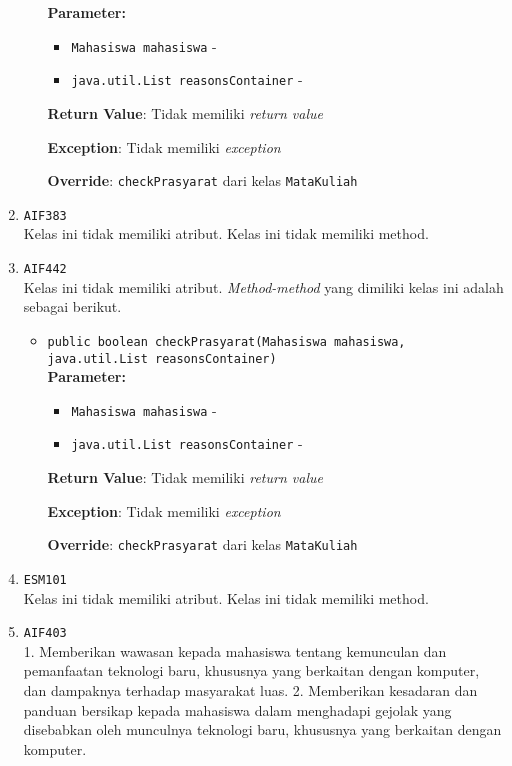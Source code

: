 \documentclass{article}
\begin{document}
\begin{enumerate}
\begin{itemize}
\textbf{Parameter:}\begin{itemize}
\item \texttt{Mahasiswa mahasiswa} - 
\item \texttt{java.util.List reasonsContainer} - 
\end{itemize}
\textbf{Return Value}: Tidak memiliki \textit{return value}

\textbf{Exception}: Tidak memiliki \textit{exception}

\textbf{Override}: \texttt{checkPrasyarat} dari kelas \texttt{MataKuliah}

\end{itemize}
\item \texttt{AIF383}\\ 


Kelas ini tidak memiliki atribut. Kelas ini tidak memiliki method. \item \texttt{AIF442}\\ 


Kelas ini tidak memiliki atribut. \textit{Method-method} yang dimiliki kelas ini adalah sebagai berikut.
\begin{itemize}
\item \texttt{public boolean checkPrasyarat(Mahasiswa mahasiswa, java.util.List reasonsContainer)}\\ 


\textbf{Parameter:}\begin{itemize}
\item \texttt{Mahasiswa mahasiswa} - 
\item \texttt{java.util.List reasonsContainer} - 
\end{itemize}
\textbf{Return Value}: Tidak memiliki \textit{return value}

\textbf{Exception}: Tidak memiliki \textit{exception}

\textbf{Override}: \texttt{checkPrasyarat} dari kelas \texttt{MataKuliah}

\end{itemize}
\item \texttt{ESM101}\\ 


Kelas ini tidak memiliki atribut. Kelas ini tidak memiliki method. \item \texttt{AIF403}\\ 
1. Memberikan wawasan kepada mahasiswa tentang kemunculan dan pemanfaatan teknologi baru, 
 khususnya yang berkaitan dengan komputer, dan dampaknya terhadap masyarakat luas.
 2. Memberikan kesadaran dan panduan bersikap kepada mahasiswa dalam menghadapi gejolak yang
 disebabkan oleh munculnya teknologi baru, khususnya yang berkaitan dengan komputer.


\end{enumerate}
\end{document}
